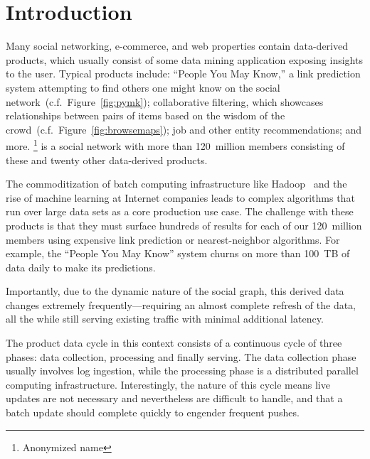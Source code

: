 \section{Introduction}
\label{sec:introduction}

Many social networking, e-commerce, and web properties contain
data-derived products, which usually consist of some data mining
application exposing insights to the user. Typical products include:
``People You May Know,'' a link prediction system attempting to find
others one might know on the social
network~(c.f.~Figure~\ref{fig:pymk}); collaborative filtering, which
showcases relationships between pairs of items based on the wisdom of
the crowd~(c.f.~Figure~\ref{fig:browsemaps}); job and other entity
recommendations; and more. \linkedin\footnote{Anonymized name} is a
social network with more than 120~million members consisting of
these and twenty other data-derived products. 

The commoditization of batch computing infrastructure like Hadoop~\cite{hadoop}
 and the rise of machine learning at Internet companies leads to complex
algorithms that run over large data sets as a core production use
case. The challenge with these products is that they must surface
hundreds of results for each of our 120~million members using
expensive link prediction or nearest-neighbor algorithms. For example,
the ``People You May Know'' system churns on more than 100~TB of data
daily to make its predictions.

Importantly, due to the dynamic nature of the social graph, this
derived data changes extremely frequently---requiring an almost
complete refresh of the data, all the while still serving existing
traffic with minimal additional latency. 

The product data cycle in this context consists of a continuous cycle
of three phases: data collection, processing and finally serving. The
data collection phase usually involves log ingestion, while the
processing phase is a distributed parallel computing infrastructure.
Interestingly, the nature of this cycle means live updates are not
necessary and nevertheless are difficult to handle, and that a batch
update should complete quickly to engender frequent pushes.
 
